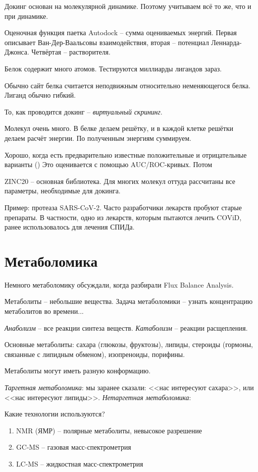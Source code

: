 \documentclass[main.tex]{subfiles}
\begin{document}
Докинг основан на молекулярной динамике.
Поэтому учитываем всё то же, что и при динамике.

Оценочная функция паетка Autodock -- сумма оцениваемых энергий.
Первая описывает Ван-Дер-Ваальсовы взаимодействия, вторая -- потенциал Леннарда-Джонса.
Четвёртая -- растворителя.

Белок содержит много атомов.
Тестируются миллиарды лигандов зараз.

Обычно сайт белка считается неподвижным относительно неменяющегося белка.
Лиганд обычно гибкий.

То, как проводится докинг -- \emph{виртуальный скрининг}.

Молекул очень много.
В белке делаем решётку, и в каждой клетке решётки делаем расчёт энергии.
По полученным энергиям суммируем.

Хорошо, когда есть предварительно известные положительные и отрицательные варианты ()
Это оценивается с помощью AUC/ROC-кривых.
Потом 

ZINC20 -- основная библиотека.
Для многих молекул оттуда рассчитаны все параметры, необходимые для докинга.

Пример: протеаза SARS-CoV-2.
Часто разработчики лекарств пробуют старые препараты.
В частности, одно из лекарств, которым пытаются лечить COViD, ранее использовалось для лечения СПИДа.

\section{Метаболомика}

Немного метаболомику обсуждали, когда разбирали  Flux Balance Analysis.

Метаболиты -- небольшие вещества.
Задача метаболомики -- узнать концентрацию метаболитов во времени...

\emph{Анаболизм} -- все реакции синтеза веществ.
\emph{Катаболизм} -- реакции расщепления.

Основные метаболиты: сахара (глюкозы, фруктозы), липиды, стероиды (гормоны, связанные с липидным обменом), изопреноиды, порифины.

Метаболиты могут иметь разную конформацию.

\emph{Таргетная метаболомика}: мы заранее сказали: <<нас интересуют сахара>>, или <<нас интересуют липиды>>.
\emph{Нетаргетная метаболомика}: 

Какие технологии используются?
\begin{enumerate}[noitemsep]
	\item NMR (ЯМР) -- полярные метаболиты, невысокое разрешение
	\item GC-MS -- газовая масс-спектрометрия
	\item LC-MS -- жидкостная масс-спектрометрия
\end{enumerate}
\end{document}
